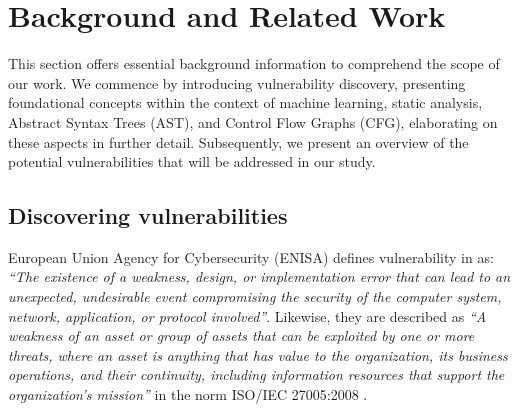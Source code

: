 % 
%  
%


\chapter{Background and Related Work}
\label{cha:background_Retaed_Work_chapter}

This section offers essential background information to comprehend the scope of our work. We commence by introducing vulnerability discovery, presenting foundational concepts within the context of machine learning, static analysis, Abstract Syntax Trees (AST), and Control Flow Graphs (CFG), elaborating on these aspects in further detail. Subsequently, we present an overview of the potential vulnerabilities that will be addressed in our study.

\section{Discovering vulnerabilities} %
\label{sec:	Discovering_vulnerabilities}

European Union Agency for Cybersecurity (ENISA) \cite{Wikipedia_ENISA} defines vulnerability in \cite{ENISA} as: \textit{``The existence of a weakness, design, or implementation error that can lead to an unexpected, undesirable event compromising the security of the computer system, network, application, or protocol involved''}. Likewise, they are described as \textit{``A weakness of an asset or group of assets that can be exploited by one or more threats, where an asset is anything that has value to the organization, its business operations, and their continuity, including information resources that support the organization's mission''} in the norm ISO/IEC 27005:2008 \cite{ISO_27005}. \\

\newpage

